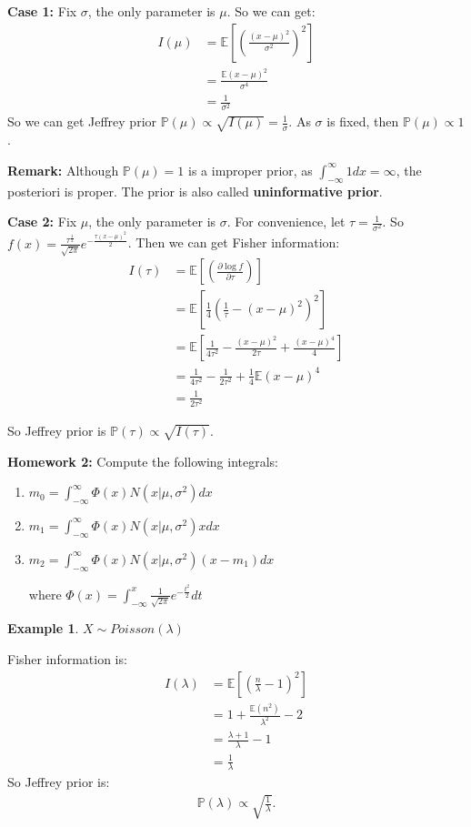 \documentclass[11pt]{article}
\def\BP{{\bf P}}
\def\BP{{\mathbb P}}
\def\BE{{\mathbb E}}
\newtheorem{example}{Example}[section]
\begin{document}
\textbf{Case 1:} Fix $\sigma$, the only parameter is $\mu$. So we can get:
\[\begin{split} 
I(\mu) &= \BE\left[ \left( \frac{(x - \mu)^2}{\sigma^2} \right)^2 \right] \\
&= \frac{\BE(x - \mu)^2}{\sigma^4} \\
&= \frac{1}{\sigma^2}
\end{split}\]
So we can get Jeffrey prior $\BP(\mu) \propto \sqrt{I(\mu)} = \frac{1}{\sigma}$. As $\sigma$ is fixed, then $\BP(\mu) \propto 1$.

\textbf{Remark:} Although $\BP(\mu) = 1$ is a improper prior, as $\int_{-\infty}^\infty 1 dx = \infty$, the posteriori is proper. 
The prior is also called \textbf{uninformative prior}.

\textbf{Case 2:} Fix $\mu$, the only parameter is $\sigma$. For convenience, let $\tau = \frac{1}{\sigma^2}$. So $f(x) = \frac{\tau^{\frac{1}{2}}}{\sqrt{2\pi}} e^{-\frac{\tau(x-\mu)^2}{2}}$. Then we can get Fisher information:
\[\begin{split}
I(\tau) &= \BE\left[\left( \frac{\partial \log f}{\partial \tau} \right)\right]  \\
&= \BE\left[ \frac{1}{4} \left( \frac{1}{\tau} - (x-\mu)^2 \right)^2  \right] \\
&= \BE\left[ \frac{1}{4\tau^2} - \frac{(x - \mu)^2}{2\tau} + \frac{(x-\mu)^4}{4} \right] \\
&= \frac{1}{4\tau^2} - \frac{1}{2\tau^2} + \frac{1}{4}\BE(x-\mu)^4 \\
&= \frac{1}{2\tau^2}
\end{split}\]

So Jeffrey prior is $\BP(\tau) \propto \sqrt{I(\tau)}$.
\newline

\textbf{Homework 2:} Compute the following integrals:
\begin{enumerate}
\item $m_0 = \int_{-\infty}^{\infty} \Phi(x) N(x|\mu, \sigma^2) dx$
\item $m_1 = \int_{-\infty}^{\infty} \Phi(x) N(x|\mu, \sigma^2)x dx$
\item $m_2 = \int_{-\infty}^{\infty} \Phi(x) N(x|\mu, \sigma^2)(x-m_1) dx$

where $\Phi(x) = \int_{-\infty}^{x} \frac{1}{\sqrt{2\pi}} e^{-\frac{t^2}{2}} dt$
\end{enumerate}

\begin{example}
$X \sim Poisson(\lambda)$
\end{example}
Fisher information is:
\[\begin{split}
I(\lambda) &= \BE\left[ \left( \frac{n}{\lambda} - 1\right)^2 \right] \\
&= 1 + \frac{\BE(n^2)}{\lambda^2} - 2 \\
&= \frac{\lambda + 1}{\lambda} - 1 \\
&= \frac{1}{\lambda}
\end{split}\]
So Jeffrey prior is:
\[\begin{split}
\BP(\lambda) \propto \sqrt{\frac{1}{\lambda}}.
\end{split}\]
 
\end{document}
